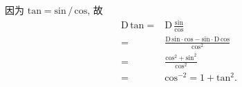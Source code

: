 \begin{example}
    因为 $\mathrm{tan} = {\mathrm{sin}}\,/\,{\mathrm{cos}}$, 故
    \begin{align*}
        \mathrm{D}\, \mathrm{tan}
        = {} & \mathrm{D}\, \frac{\mathrm{sin}}{\mathrm{cos}}                                                                     \\
        = {} & \frac{\mathrm{D}\, \mathrm{sin} \cdot \mathrm{cos} - \mathrm{sin} \cdot \mathrm{D}\, \mathrm{cos}}{\mathrm{cos}^2} \\
        = {} & \frac{\mathrm{cos}^2 + \mathrm{sin}^2}{\mathrm{cos}^2}                                                             \\
        = {} & \mathrm{cos}^{-2} = 1 + \mathrm{tan}^2.
    \end{align*}
\end{example}

